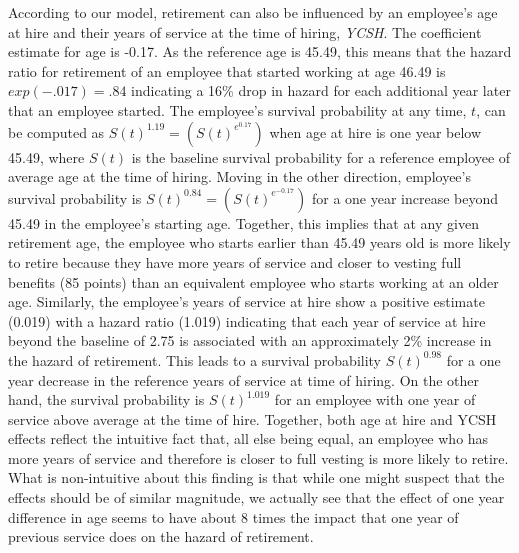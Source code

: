 \documentclass[12pt,letterpaper]{article}
\begin{document}
According to our model, retirement can also be influenced by an employee's age at hire and their years of service at the time of hiring, {\it YCSH}.  The coefficient estimate for age is -0.17. As the reference age is 45.49, this means that the hazard ratio for retirement of an employee that started working at age 46.49 is $exp(-.017)=.84$ indicating a 16\% drop in hazard for each additional year later that an employee started. The employee's survival probability at any time, $t$, can be computed as $S(t)^{1.19} = (S(t)^{e^{0.17}})$ when age at hire is one year below 45.49,  where $S(t)$ is the baseline survival probability for a reference employee of average age at the time of hiring. Moving in the other direction, employee's survival probability is $S(t)^{0.84}=(S(t)^{e^{-0.17}})$ for a one year increase beyond 45.49 in the employee's starting age. Together, this implies that at any given retirement age, the employee who starts earlier than 45.49 years old is more likely to retire because they have more years of service and closer to vesting full benefits (85 points) than an equivalent employee who starts working at an older age. Similarly, the employee's years of service at hire show a positive estimate (0.019) with a hazard ratio (1.019) indicating that each year of service at hire beyond the baseline of 2.75 is associated with an approximately 2\% increase in the hazard of retirement.  This leads to a survival probability $S(t)^{0.98}$ for a one year decrease in the reference years of service at time of hiring.  On the other hand, the survival probability is $S(t)^{1.019}$ for an employee with one year of service above average at the time of hire. Together, both age at hire and YCSH effects reflect the intuitive fact that, all else being equal, an employee who has more years of service and therefore is closer to full vesting is more likely to retire.  What is non-intuitive about this finding is that while one might suspect that the effects should be of similar magnitude, we actually see that the effect of one year difference in age seems to have about 8 times the impact that one year of previous service does on the hazard of retirement.
\end{document}

